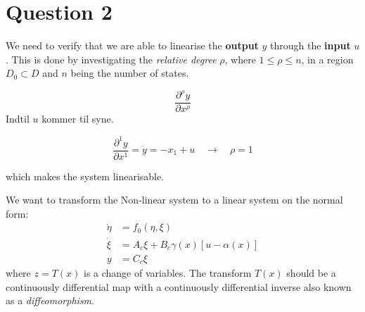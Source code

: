 \chapter{Question 2}

We need to verify that we are able to linearise the \textbf{output} $y$ through the \textbf{input} $u$. This is done by investigating the \textit{relative degree} $\rho$, where $1 \leq \rho \leq n$, in a region $D_0 \subset D$ and $n$ being the number of states.

\begin{equation}
        \frac{\partial^\rho y}{\partial x^\rho}
\end{equation} Indtil $u$ kommer til syne.

\begin{equation}
        \frac{\partial^1 y}{\partial x^1}=\dot{y} = -x_1 + u \quad \rightarrow \quad \rho = 1
\end{equation}

which makes the system linearisable.

We want to transform the Non-linear system to a linear system on the normal form:
\begin{equation}
        \begin{split}
                \dot{\eta} &= f_0(\eta,\xi) \\
                \dot{\xi} &= A_c \xi + B_c \gamma(x) \left[u - \alpha(x)\right] \\
                y &= C_c \xi
        \end{split}
\end{equation}
where $z = T(x)$ is a change of variables. The transform $T(x)$ should be a continuously differential map with a continuously differential inverse also known as a \textit{diffeomorphism}.

